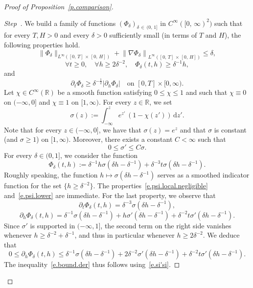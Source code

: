 \documentclass[AHL,Unicode,longabstracts,published]{cedram}
\newcommand{\R}{\mathbb{R}}
\renewcommand{\d}{\mathrm{d}}
\newcommand{\1}{\mathds{1}}
\renewcommand{\le}{\leqslant}
\renewcommand{\ge}{\geqslant}
\newcommand{\de}{\delta}
\newcommand{\si}{\sigma}
\newcounter{stepcount}
\newenvironment{step}{\refstepcounter{stepcount}\begin{proof}[Step~\thestepcount]}{\let\qed\relax\end{proof}}
\let\oldforall\forall
\renewcommand*{\forall}{\mathrel{\oldforall}}
\begin{document}
\begin{proof}[Proof of Proposition~\ref{p.comparison}]
\begin{step}\label{proofprop4.2Step0}
We build a family of functions $(\Phi_\de)_{\de\,\in\,(0,\,1]}$ in $C^\infty([0,\,\infty)^2)$ such that for every $T,H > 0$ and every $\delta > 0$ sufficiently small (in terms of $T$ and $H$), the following properties hold.
\begin{equation}\label{e.psi.local.negligible}
\|\Phi_\delta\|_{L^\infty\left([0,\,T]\,\times\,[0,\,H]\right)} + \left\|\nabla \Phi_\delta\right\|_{L^\infty\left([0,\,T]\,\times\, [0,\,H]\right)} \le \de,
\end{equation}
\begin{equation}\label{e.psi.lower}
\forall t\ge 0, \quad \forall h \ge 2 \delta^{-2}, \quad \Phi_\delta(t,h) \ge \delta^{-1} h,
\end{equation}
and
\begin{equation}\label{e.bound.der}
\partial_t \Phi_\delta \ge \delta^{-\frac 1 2} \left|\partial_h \Phi_\delta\right| \quad \text{on } [0,T] \times [0,\infty).
\end{equation}
Let $\chi \in C^\infty(\R)$ be a smooth function satisfying $0 \le \chi \le 1$ and such that $\chi \equiv 0$ on $(-\infty,0]$ and $\chi \equiv 1$ on $[1,\infty)$. For every $z \in \R$, we set
\[
\sigma(z) := \int_{-\infty}^z e^{z'} \, \left(1-\chi(z')\right) \, \d z'.
\]
Note that for every $z \in (-\infty,0]$, we have that $\sigma(z) = e^{z}$ and that $\sigma$ is constant (and $\sigma \ge 1$) on $[1,\infty)$. Moreover, there exists a constant $C < \infty$ such that
\begin{equation}\label{e.si'si}
0 \le \sigma' \le C \sigma.
\end{equation}
For every $\delta \in (0,1]$, we consider the function
\[
\Phi_\delta(t,h) := \delta^{-1} h \sigma\left(\delta h - \de^{-1}\right) +\delta^{-3} t \sigma\left(\de h - \de^{-1}\right).
\]
Roughly speaking, the function $h \mapsto \si(\de h - \de^{-1})$ serves as a smoothed indicator function for the set $\{h \ge \de^{-2}\}$. The properties~\eqref{e.psi.local.negligible} and~\eqref{e.psi.lower} are immediate. For the last property, we observe that
\[
\partial_t \Phi_\delta(t,h) = \de^{-3} \sigma\left(\de h - \de^{-1}\right),
\]
\[
\partial_h \Phi_\delta(t,h) = \delta^{-1} \sigma\left(\de h - \de^{-1}\right) + h \si'\left(\de h - \de^{-1}\right) + \de^{-2} t \si'\left(\de h - \de^{-1}\right).
\]
Since $\sigma'$ is supported in $(-\infty,1]$, the second term on the right side vanishes whenever $h \ge \de^{-2} + \de^{-1}$, and thus in particular whenever $h \ge 2 \de^{-2}$. We deduce that
\[
0 \le \partial_h \Phi_\delta(t,h) \le \delta^{-1} \sigma\left(\de h - \de^{-1}\right) + 2\de^{-2} \si'\left(\de h -\de^{-1}\right) + \de^{-2} t \si'\left(\de h - \de^{-1}\right).
\]
The inequality~\eqref{e.bound.der} thus follows using~\eqref{e.si'si}.
\end{step}


\end{proof}
\end{document}
